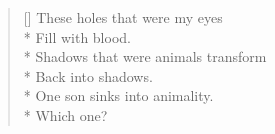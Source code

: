 \label{ch:lear_bd}
\settowidth{\versewidth}{Shadows that were animals transform}
\begin{verse}[\versewidth]
 These holes that were my eyes\\*
Fill with blood.\\*
Shadows that were animals transform\\*
Back into shadows.\\*
One son sinks into animality.\\*
Which one?
\end{verse}
